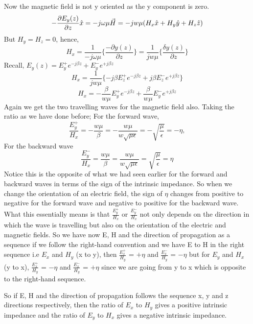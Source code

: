 Now the magnetic field is not y oriented as the y component is zero.
\begin{dmath*}
-\pdv{E_y(z)}{z}\hat{x} = -j\omega\mu\vec{H} = -jw\mu (H_x\hat{x} + H_y\hat{y} + H_z\hat{z}) 
\end{dmath*}
But	$H_y = H_z = 0$, hence,
\begin{dmath*}
H_x = \frac{1}{-j\omega\mu}\{\frac{-\partial y(z)}{\partial z}\} = \frac{1}{jw\mu}\{\frac{\delta y(z)}{\partial z}\}
\end{dmath*} 
Recall,
$E_y(z) = E_y^+ e^{-j\beta z} + E_y^- e^{+j\beta z}$
\begin{dmath*}
H_x= \frac{1}{jw\mu} \{-j\beta E_z^+e^{-j\beta z} + j\beta E_z^-e^{+j\beta z} \}
\end{dmath*}
\begin{dmath*}
H_x = - \frac{\beta}{w\mu} E_y^+e^{-j\beta z} +\frac{\beta}{w\mu}E_y^-e^{+j\beta z}
\end{dmath*}
Again we get the two travelling waves for the magnetic field also. Taking the ratio as we have done before; 
For the forward wave,
\begin{dmath*}
\frac{E_y^+}{H_x} = -\frac{w\mu}{\beta} = -\frac{w\mu}{w\sqrt{\mu \epsilon}} = -\sqrt{\frac{\mu}{\epsilon}} = -\eta,
\end{dmath*}
For the backward wave
\begin{dmath*}
\frac{E_y^-}{H_x} = \frac{w\mu}{\beta} = \frac{w\mu}{w\sqrt{\mu \epsilon}} = \sqrt{\frac{\mu}{\epsilon}} = \eta
\end{dmath*}
Notice this is the opposite of what we had seen earlier for the forward and backward waves in terms of the sign of the intrinsic impedance. So when we change the orientation of an electric field, the sign of $\eta$ changes from positive to negative for the forward wave and negative to positive for the backward wave. What this essentially means is that $\frac{E_y^+}{H_x}$ or $\frac{E_y^-}{H_x}$ not only depends on the direction in which the wave is travelling but also on the orientation of the electric and magnetic fields. So we have now E, H and the direction of propagation as a sequence if we follow the right-hand convention and we have E to H in the right sequence i.e $E_x$ and $H_y$ (x to y), then $\frac{E_x^+}{H_y}$ = $+\eta$ and $\frac{E_x^-}{H_y}$ = $-\eta$ but for $E_y$ and $H_x$ (y to x), $\frac{E_x^+}{H_y}$ = $-\eta$ and $\frac{E_x^-}{H_y}$ = $+\eta$ since we are going from y to x which is opposite to the right-hand sequence.

So if E, H and the direction of propagation follows the sequence x, y and z directions respectively, then the ratio of $E_x$ to $H_y$ gives a positive intrinsic impedance and the ratio of $E_y$ to $H_x$ gives a negative intrinsic impedance. 

